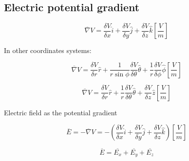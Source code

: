 \documentclass[letterpaper]{article}
\newcommand{\divline}{\noindent\makebox[\linewidth]{\rule{\textwidth}{0.4pt}}}
\begin{document}
    \divline
    \begin{multicols}{2}
        \section{Electric potential gradient}

        \[\overline{\nabla} V = \frac{\delta V}{\delta x} \hat{i} + \frac{\delta V}{\delta y} \hat{j} + \frac{\delta V}{\delta z} \hat{k} \left[ \frac{V}{m} \right] \]

        In other coordinates systems:

        \[\overline{\nabla} V = \frac{\delta V}{\delta r} \hat{r} + \frac{1}{r \sin{\phi}} \frac{\delta V}{\delta \theta} \hat{\theta} + \frac{1}{r} \frac{\delta V}{\delta \phi} \hat{\phi} \left[ \frac{V}{m} \right] \]

        \[\overline{\nabla} V = \frac{\delta V}{\delta r} \hat{r} + \frac{1}{r} \frac{\delta V}{\delta \theta} \hat{\theta} + \frac{\delta V}{\delta z} \hat{z} \left[ \frac{V}{m} \right] \]

        Electric field as the potential gradient

        \[\overline{E} =   - \overline{\nabla} V =  - \left( \frac{\delta V}{\delta x} \hat{i} + \frac{\delta V}{\delta y} \hat{j} + \frac{\delta V}{\delta z} \hat{k} \right) \left[ \frac{V}{m} \right] \]

        \[\overline{E} = \overline{E_{x}} + \overline{E_{y}} + \overline{E_{z}} \]
        
    \end{multicols}
    
\end{document}
